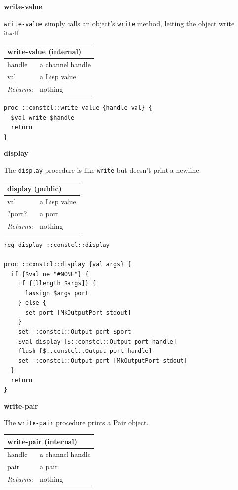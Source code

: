 \documentclass[twoside,9pt]{report}
\begin{document}
\textbf{write-value}


\texttt{write-value} simply calls an object's \texttt{write} method, letting the object write itself.

\begin{tabular}{ |l l| }
\hline
\multicolumn{2}{|l|}{write-value (internal)} \\
\hline
handle & a channel handle \\
val & a Lisp value \\
\textit{Returns:} & nothing \\
\hline
\end{tabular}

\noindent\makebox[\linewidth]{\rule{\linewidth}{0.4pt}}
\begin{lstlisting}
proc ::constcl::write-value {handle val} {
  $val write $handle
  return
}
\end{lstlisting}
\noindent\makebox[\linewidth]{\rule{\linewidth}{0.4pt}}

\textbf{display}


The \texttt{display} procedure is like \texttt{write} but doesn't print a newline.

\begin{tabular}{ |l l| }
\hline
\multicolumn{2}{|l|}{display (public)} \\
\hline
val & a Lisp value \\
?port? & a port \\
\textit{Returns:} & nothing \\
\hline
\end{tabular}

\noindent\makebox[\linewidth]{\rule{\linewidth}{0.4pt}}
\begin{lstlisting}
reg display ::constcl::display
 
proc ::constcl::display {val args} {
  if {$val ne "#NONE"} {
    if {[llength $args]} {
      lassign $args port
    } else {
      set port [MkOutputPort stdout]
    }
    set ::constcl::Output_port $port
    $val display [$::constcl::Output_port handle]
    flush [$::constcl::Output_port handle]
    set ::constcl::Output_port [MkOutputPort stdout]
  }
  return
}
\end{lstlisting}
\noindent\makebox[\linewidth]{\rule{\linewidth}{0.4pt}}

\textbf{write-pair}


The \texttt{write-pair} procedure prints a Pair object.

\begin{tabular}{ |l l| }
\hline
\multicolumn{2}{|l|}{write-pair (internal)} \\
\hline
handle & a channel handle \\
pair & a pair \\
\textit{Returns:} & nothing \\
\hline
\end{tabular}
\end{document}

